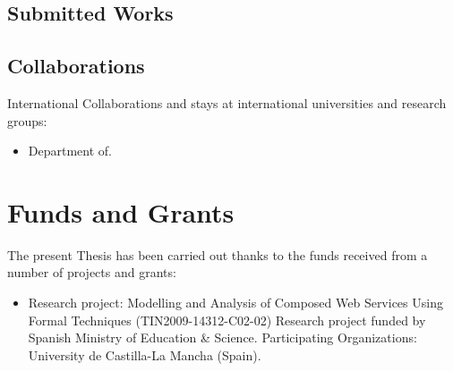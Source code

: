 \subsection{Submitted Works}
%
\subsection{Collaborations}
%
International Collaborations and stays at international universities and research groups:
%
\begin{itemize}
%
\item Department of. 
%
\end{itemize}
%
\section{Funds and Grants}\label{funds}
%
The present Thesis has been carried out thanks to the funds received from a number of projects and grants:
%
\begin{itemize}
%
\item Research project: Modelling and Analysis of Composed Web Services Using Formal Techniques (TIN2009-14312-C02-02)\newline
Research project funded by Spanish Ministry of Education \& Science.\newline
Participating Organizations: University de Castilla-La Mancha (Spain).
%
%
\end{itemize}